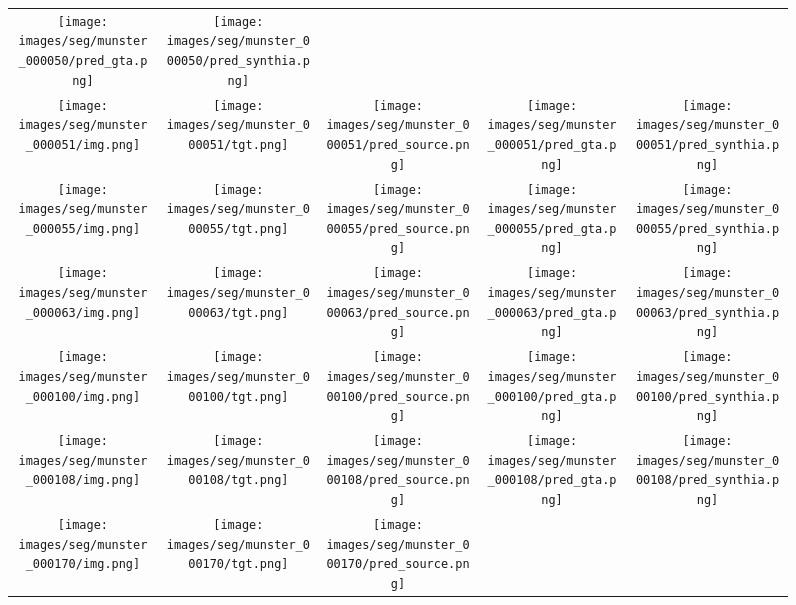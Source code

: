 \documentclass{bmvc2k}
\begin{document}
\begin{figure}[!htb]
\begin{tabular}{@{\hskip2pt}c@{\hskip2pt}c@{\hskip2pt}c@{\hskip2pt}c@{\hskip2pt}c}
		\texttt{[image: images/seg/munster\_000050/pred\_gta.png]}&
		\texttt{[image: images/seg/munster\_000050/pred\_synthia.png]}\\
		\texttt{[image: images/seg/munster\_000051/img.png]}&
		\texttt{[image: images/seg/munster\_000051/tgt.png]}&
		\texttt{[image: images/seg/munster\_000051/pred\_source.png]}&
		\texttt{[image: images/seg/munster\_000051/pred\_gta.png]}&
		\texttt{[image: images/seg/munster\_000051/pred\_synthia.png]}\\
		\texttt{[image: images/seg/munster\_000055/img.png]}&
		\texttt{[image: images/seg/munster\_000055/tgt.png]}&
		\texttt{[image: images/seg/munster\_000055/pred\_source.png]}&
		\texttt{[image: images/seg/munster\_000055/pred\_gta.png]}&
		\texttt{[image: images/seg/munster\_000055/pred\_synthia.png]}\\
		\texttt{[image: images/seg/munster\_000063/img.png]}&
		\texttt{[image: images/seg/munster\_000063/tgt.png]}&
		\texttt{[image: images/seg/munster\_000063/pred\_source.png]}&
		\texttt{[image: images/seg/munster\_000063/pred\_gta.png]}&
		\texttt{[image: images/seg/munster\_000063/pred\_synthia.png]}\\
		\texttt{[image: images/seg/munster\_000100/img.png]}&
		\texttt{[image: images/seg/munster\_000100/tgt.png]}&
		\texttt{[image: images/seg/munster\_000100/pred\_source.png]}&
		\texttt{[image: images/seg/munster\_000100/pred\_gta.png]}&
		\texttt{[image: images/seg/munster\_000100/pred\_synthia.png]}\\
		\texttt{[image: images/seg/munster\_000108/img.png]}&
		\texttt{[image: images/seg/munster\_000108/tgt.png]}&
		\texttt{[image: images/seg/munster\_000108/pred\_source.png]}&
		\texttt{[image: images/seg/munster\_000108/pred\_gta.png]}&
		\texttt{[image: images/seg/munster\_000108/pred\_synthia.png]}\\
		\texttt{[image: images/seg/munster\_000170/img.png]}&
		\texttt{[image: images/seg/munster\_000170/tgt.png]}&
		\texttt{[image: images/seg/munster\_000170/pred\_source.png]}&

\end{tabular}
\end{figure}
\end{document}
